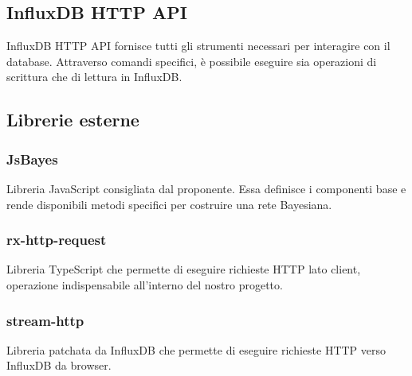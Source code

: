 \subsection{InfluxDB HTTP API}
InfluxDB HTTP API fornisce tutti gli strumenti necessari per interagire con il database. Attraverso comandi specifici, è possibile eseguire sia operazioni di scrittura che di lettura in InfluxDB.
\subsection{Librerie esterne}
\subsubsection{JsBayes}
Libreria JavaScript consigliata dal proponente. Essa definisce i componenti base e rende disponibili metodi specifici per costruire una rete Bayesiana.

\subsubsection{rx-http-request}
Libreria TypeScript che permette di eseguire richieste HTTP lato client, operazione indispensabile all'interno del nostro progetto. 

\subsubsection{stream-http}
Libreria patchata da InfluxDB che permette di eseguire richieste HTTP verso InfluxDB da browser. 